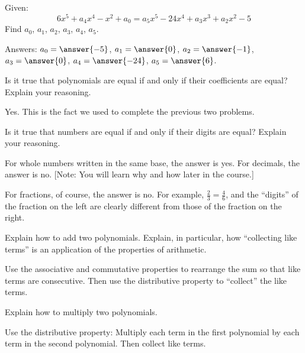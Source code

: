 \documentclass[nooutcomes]{ximera}
\begin{document}
\begin{problem}Given:
\[
6x^5+a_4 x^4 -x^2 + a_0 = a_5 x^5 - 24 x^4 + a_3 x^3 + a_2 x^2 - 5
\]
Find $a_0$, $a_1$, $a_2$, $a_3$, $a_4$, $a_5$.

Answers: $a_0=\answer{-5}$, $a_1=\answer{0}$, $a_2=\answer{-1}$, $a_3=\answer{0}$, $a_4=\answer{-24}$, $a_5=\answer{6}$.
\end{problem} 

\begin{problem}Is it true that polynomials are equal if and only if their
  coefficients are equal? Explain your reasoning.
\begin{freeResponse}
\begin{hint}
Yes.  This is the fact we used to complete the previous two problems.
\end{hint}
\end{freeResponse}
\end{problem} 

\begin{problem}Is it true that numbers are equal if and only if their digits
  are equal? Explain your reasoning.
\begin{freeResponse}
\begin{hint}
For whole numbers written in the same base, the answer is yes.  For decimals, the answer is no.  [Note: You will learn why and how later in the course.] 

For fractions, of course, the answer is no.  For example, $\frac{2}{3}=\frac{4}{6}$, and the ``digits'' of the fraction on the left are clearly different from those of the fraction on the right. 
\end{hint}
\end{freeResponse}
\end{problem} 

\begin{problem}Explain how to add two polynomials.  Explain, in particular, how ``collecting like terms'' is
an application of the properties of arithmetic.  
\begin{freeResponse}
\begin{hint}
Use the associative and commutative properties to rearrange the sum so that like terms are consecutive.  Then use the distributive property to ``collect'' the like terms. 
\end{hint}
\end{freeResponse}
\end{problem} 

\begin{problem}Explain how to multiply two polynomials.
\begin{freeResponse}
\begin{hint}
Use the distributive property:  Multiply each term in the first polynomial by each term in the second polynomial.  Then collect like terms.  
\end{hint}
\end{freeResponse}
\end{problem} 
\end{document}
